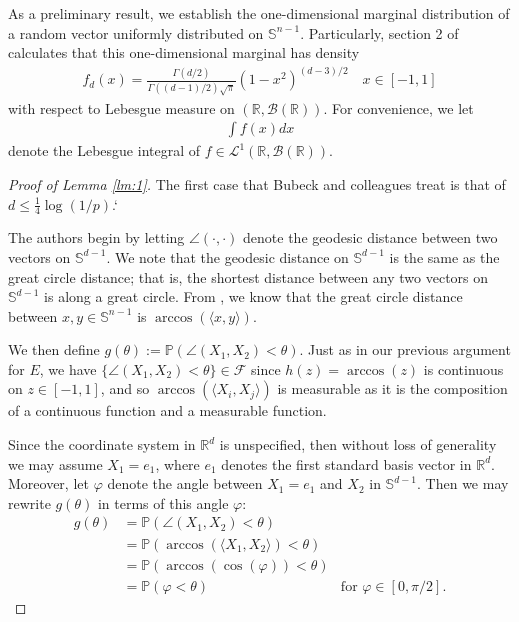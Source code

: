 \documentclass{article}
\begin{document}
As a preliminary result, we establish the one-dimensional marginal distribution of a random vector uniformly distributed on $\mathbb{S}^{n-1}$. Particularly, section 2 of \cite{sodin2005tail} calculates that this one-dimensional marginal has density
\begin{align*}
    f_d(x) = \frac{\Gamma(d/2)}{\Gamma((d-1)/2)\sqrt{\pi}}(1 - x^2)^{(d-3)/2} \quad x \in [-1, 1]
\end{align*}
with respect to Lebesgue measure on $(\mathbb{R}, \mathcal{B}(\mathbb{R}))$. For convenience, we let 
\begin{align*}
    \int f(x) dx 
\end{align*}
denote the Lebesgue integral of $f \in \mathcal{L}^1(\mathbb{R}, \mathcal{B}(\mathbb{R}))$. 

\begin{proof}[Proof of Lemma \ref{lm:1}]
The first case that Bubeck and colleagues treat is that of $d \leq \frac{1}{4}\log(1/p)$.`

The authors begin by letting $\angle(\cdot, \cdot)$ denote the geodesic distance between two vectors on $\mathbb{S}^{d-1}$. We note that the geodesic distance on $\mathbb{S}^{d-1}$ is the same as the great circle distance; that is, the shortest distance between any two vectors on $\mathbb{S}^{d-1}$ is along a great circle. From \cite{sodin2005tail}, we know that the great circle distance between $x, y \in \mathbb{S}^{n-1}$ is $\arccos{(\langle x, y \rangle)}.$

We then define $g(\theta) := \mathbb{P}(\angle(X_1, X_2) < \theta)$. Just as in our previous argument for $E$, we have $\{\angle(X_1, X_2) < \theta\} \in \mathcal{F}$ since $h(z) = \arccos(z)$ is continuous on $z \in [-1, 1]$, and so $\arccos( \langle X_i, X_j \rangle)$ is measurable as it is the composition of a continuous function and a measurable function. 

Since the coordinate system in $\mathbb{R}^d$ is unspecified, then without loss of generality we may assume $X_1 = e_1$, where $e_1$ denotes the first standard basis vector in $\mathbb{R}^d$. Moreover, let $\varphi$ denote the angle between $X_1 = e_1$ and $X_2$ in $\mathbb{S}^{d-1}$. Then we may rewrite $g(\theta)$ in terms of this angle $\varphi$:
\begin{align*}
   g(\theta) &= \mathbb{P} ( \angle (X_1, X_2) < \theta)\\
   &= \mathbb{P}(\arccos (\langle X_1, X_2 \rangle) < \theta)\\
   &= \mathbb{P}(\arccos(\cos(\varphi))< \theta)\\
   &= \mathbb{P}(\varphi < \theta) & \text{for $\varphi \in [0, \pi/2]$.}
\end{align*}


\end{proof}
\end{document}

